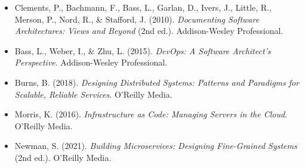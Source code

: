 \documentclass[11pt]{article}
\begin{document}
\begin{itemize}
  \item Clements, P., Bachmann, F., Bass, L., Garlan, D., Ivers, J., Little, R., Merson, P., Nord, R., \& Stafford, J. (2010). \textit{Documenting Software Architectures: Views and Beyond} (2nd ed.). Addison-Wesley Professional.
  \item Bass, L., Weber, I., \& Zhu, L. (2015). \textit{DevOps: A Software Architect's Perspective}. Addison-Wesley Professional.
  \item Burns, B. (2018). \textit{Designing Distributed Systems: Patterns and Paradigms for Scalable, Reliable Services}. O'Reilly Media.
  \item Morris, K. (2016). \textit{Infrastructure as Code: Managing Servers in the Cloud}. O'Reilly Media.
  \item Newman, S. (2021). \textit{Building Microservices: Designing Fine-Grained Systems} (2nd ed.). O'Reilly Media.
\end{itemize}

\listoffigures
\end{document}
